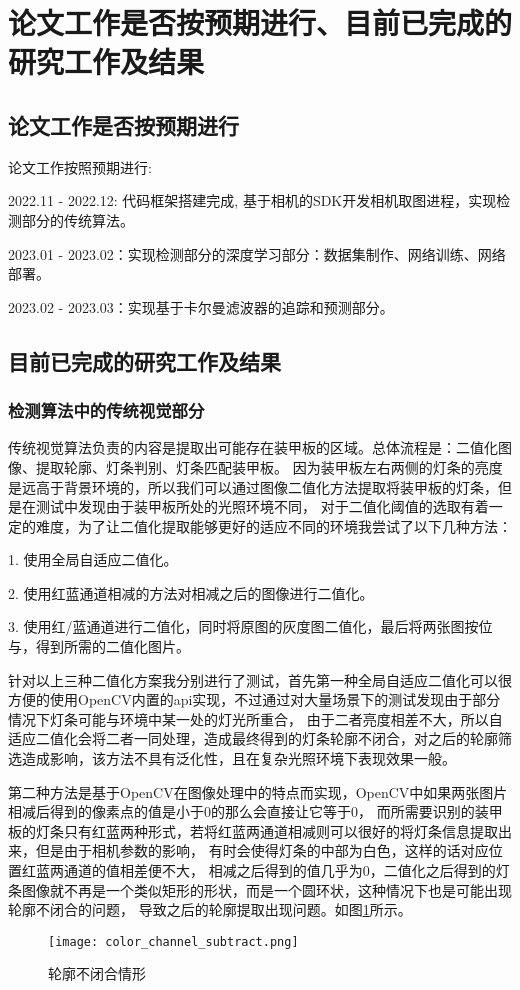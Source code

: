 \section{论文工作是否按预期进行、目前已完成的研究工作及结果}
\subsection{论文工作是否按预期进行}
论文工作按照预期进行: \par
2022.11 - 2022.12: 代码框架搭建完成, 基于相机的SDK开发相机取图进程，实现检测部分的传统算法。\par
2023.01 - 2023.02：实现检测部分的深度学习部分：数据集制作、网络训练、网络部署。\par
2023.02 - 2023.03：实现基于卡尔曼滤波器的追踪和预测部分。\par
\subsection{目前已完成的研究工作及结果}
\subsubsection{检测算法中的传统视觉部分}
传统视觉算法负责的内容是提取出可能存在装甲板的区域。总体流程是：二值化图像、提取轮廓、灯条判别、灯条匹配装甲板。
因为装甲板左右两侧的灯条的亮度是远高于背景环境的，所以我们可以通过图像二值化方法提取将装甲板的灯条，但是在测试中发现由于装甲板所处的光照环境不同，
对于二值化阈值的选取有着一定的难度，为了让二值化提取能够更好的适应不同的环境我尝试了以下几种方法：\par
1. 使用全局自适应二值化。\par
2. 使用红蓝通道相减的方法对相减之后的图像进行二值化。\par
3. 使用红/蓝通道进行二值化，同时将原图的灰度图二值化，最后将两张图按位与，得到所需的二值化图片。\par

针对以上三种二值化方案我分别进行了测试，首先第一种全局自适应二值化可以很方便的使用OpenCV\cite{bradski2000opencv}内置的api实现，不过通过对大量场景下的测试发现由于部分情况下灯条可能与环境中某一处的灯光所重合，
由于二者亮度相差不大，所以自适应二值化会将二者一同处理，造成最终得到的灯条轮廓不闭合，对之后的轮廓筛选造成影响，该方法不具有泛化性，且在复杂光照环境下表现效果一般。\par

第二种方法是基于OpenCV在图像处理中的特点而实现，OpenCV中如果两张图片相减后得到的像素点的值是小于0的那么会直接让它等于0，
而所需要识别的装甲板的灯条只有红蓝两种形式，若将红蓝两通道相减则可以很好的将灯条信息提取出来，但是由于相机参数的影响，
有时会使得灯条的中部为白色，这样的话对应位置红蓝两通道的值相差便不大，
相减之后得到的值几乎为0，二值化之后得到的灯条图像就不再是一个类似矩形的形状，而是一个圆环状，这种情况下也是可能出现轮廓不闭合的问题，
导致之后的轮廓提取出现问题。如图\ref{轮廓不闭合情形}所示。\par
\begin{figure}[H]
    \centering
    \texttt{[image: color\_channel\_subtract.png]} 
    \caption{轮廓不闭合情形} 
    \label{轮廓不闭合情形}
\end{figure}


